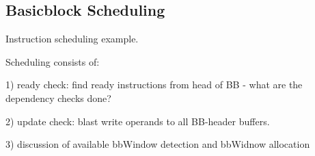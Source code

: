 \subsection{Basicblock Scheduling}
\label{sec:scheduling}

Instruction scheduling example.

Scheduling consists of:

1) ready check: find ready instructions from head of BB - what are the
dependency checks done?

2) update check: blast write operands to all BB-header buffers. 

3) discussion of available bbWindow detection and bbWidnow allocation

% 
% 
% 
